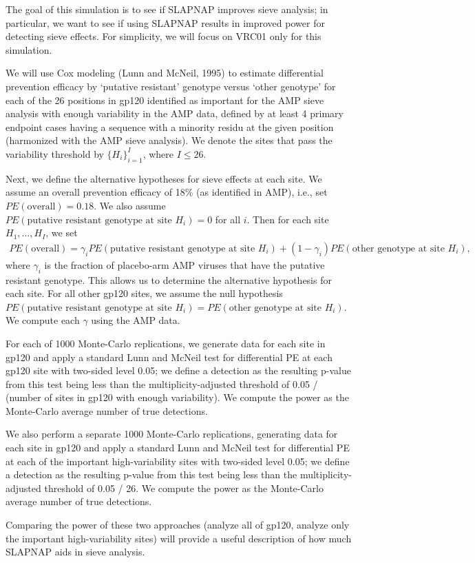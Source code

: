 \documentclass[10pt]{article}
\begin{document}
The goal of this simulation is to see if SLAPNAP improves sieve analysis; in particular, we want to see if using SLAPNAP results in improved power for detecting sieve effects. For simplicity, we will focus on VRC01 only for this simulation.

We will use Cox modeling (Lunn and McNeil, 1995) to estimate differential prevention efficacy by `putative resistant' genotype versus `other genotype' for each of the 26 positions in gp120 identified as important for the AMP sieve analysis with enough variability in the AMP data, defined by at least 4 primary endpoint cases having a sequence with a minority residu at the given position (harmonized with the AMP sieve analysis). We denote the sites that pass the variability threshold by $\{H_i\}_{i=1}^I$, where $I \leq 26$.

Next, we define the alternative hypotheses for sieve effects at each site. We assume an overall prevention efficacy of 18\% (as identified in AMP), i.e., set $PE(\text{overall}) = 0.18$. We also assume $PE(\text{putative resistant genotype at site } H_i) = 0$ for all $i$. Then for each site $H_1,\ldots,H_I$, we set
\begin{align*}
    PE(\text{overall}) = \gamma_i PE(\text{putative resistant genotype at site } H_i) + (1 - \gamma_i)PE(\text{other genotype at site } H_i),
\end{align*}
where $\gamma_i$ is the fraction of placebo-arm AMP viruses that have the putative resistant genotype. This allows us to determine the alternative hypothesis for each site. For all other gp120 sites, we assume the null hypothesis $PE(\text{putative resistant genotype at site } H_i) = PE(\text{other genotype at site } H_i)$. We compute each $\gamma$ using the AMP data.

For each of 1000 Monte-Carlo replications, we generate data for each site in gp120 and apply a standard Lunn and McNeil test for differential PE at each gp120 site with two-sided level 0.05; we define a detection as the resulting p-value from this test being less than the multiplicity-adjusted threshold of 0.05 / (number of sites in gp120 with enough variability). We compute the power as the Monte-Carlo average number of true detections.

We also perform a separate 1000 Monte-Carlo replications, generating data for each site in gp120 and apply a standard Lunn and McNeil test for differential PE at each of the important high-variability sites with two-sided level 0.05; we define a detection as the resulting p-value from this test being less than the multiplicity-adjusted threshold of 0.05 / 26. We compute the power as the Monte-Carlo average number of true detections.

Comparing the power of these two approaches (analyze all of gp120, analyze only the important high-variability sites) will provide a useful description of how much SLAPNAP aids in sieve analysis.
\end{document}
